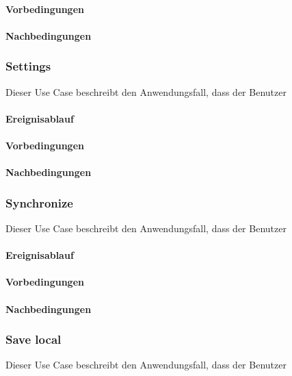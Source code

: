 			\paragraph{Vorbedingungen}
			
			\paragraph{Nachbedingungen}
	
		\subsubsection{Settings}
			Dieser Use Case beschreibt den Anwendungsfall, dass der Benutzer 
			
			\paragraph{Ereignisablauf}
	
			\paragraph{Vorbedingungen}
			
			\paragraph{Nachbedingungen}
	
		\subsubsection{Synchronize}
			Dieser Use Case beschreibt den Anwendungsfall, dass der Benutzer 
			
			\paragraph{Ereignisablauf}
	
			\paragraph{Vorbedingungen}
			
			\paragraph{Nachbedingungen}
	
		\subsubsection{Save local}
			Dieser Use Case beschreibt den Anwendungsfall, dass der Benutzer 
			
